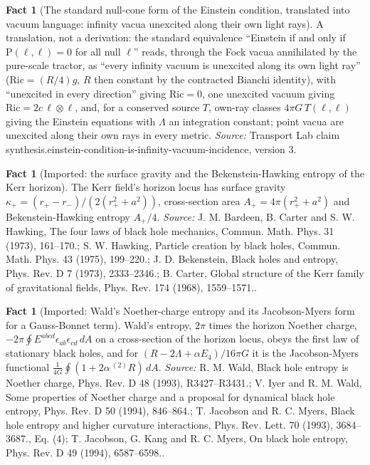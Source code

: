 \documentclass[11pt]{article}
\theoremstyle{definition}
\newtheorem{fact}[theorem]{Fact}
\theoremstyle{plain}
\providecommand{\Ric}{}\renewcommand{\Ric}{\mathrm{Ric}}
\providecommand{\Sch}{}\renewcommand{\Sch}{\mathrm{P}}
\begin{document}
\begin{fact}[The standard null-cone form of the Einstein condition, translated into vacuum language: infinity vacua unexcited along their own light rays]\label{c:synthesis.einstein-condition-is-infinity-vacuum-incidence}
A translation, not a derivation: the standard equivalence ``Einstein if and only if $\Sch(\ell,\ell) = 0$ for all null $\ell$'' reads, through the Fock vacua annihilated by the pure-scale tractor, as ``every infinity vacuum is unexcited along its own light ray'' ($\Ric = (R/4)g$, $R$ then constant by the contracted Bianchi identity), with ``unexcited in every direction'' giving $\Ric = 0$, one unexcited vacuum giving $\Ric = 2c\,\ell\otimes\ell$, and, for a conserved source $T$, own-ray classes $4\pi G\,T(\ell,\ell)$ giving the Einstein equations with $\Lambda$ an integration constant; point vacua are unexcited along their own rays in every metric.
\emph{Source:} Transport Lab claim synthesis.einstein-condition-is-infinity-vacuum-incidence, version 3.
\end{fact}

\begin{fact}[Imported: the surface gravity and the Bekenstein-Hawking entropy of the Kerr horizon]\label{c:synthesis.imported-kerr-surface-gravity-entropy}
The Kerr field's horizon locus has surface gravity $\kappa_{+} = (r_{+} - r_{-})/(2(r_{+}^{2} + a^{2}))$, cross-section area $A_{+} = 4\pi(r_{+}^{2} + a^{2})$ and Bekenstein-Hawking entropy $A_{+}/4$.
\emph{Source:} J. M. Bardeen, B. Carter and S. W. Hawking, The four laws of black hole mechanics, Commun. Math. Phys. 31 (1973), 161--170.; S. W. Hawking, Particle creation by black holes, Commun. Math. Phys. 43 (1975), 199--220.; J. D. Bekenstein, Black holes and entropy, Phys. Rev. D 7 (1973), 2333--2346.; B. Carter, Global structure of the Kerr family of gravitational fields, Phys. Rev. 174 (1968), 1559--1571..
\end{fact}

\begin{fact}[Imported: Wald's Noether-charge entropy and its Jacobson-Myers form for a Gauss-Bonnet term]\label{c:synthesis.imported-wald-noether-charge-entropy}
Wald's entropy, $2\pi$ times the horizon Noether charge, $-2\pi\oint E^{abcd}\epsilon_{ab}\epsilon_{cd}\,dA$ on a cross-section of the horizon locus, obeys the first law of stationary black holes, and for $(R - 2\Lambda + \alpha E_{4})/16\pi G$ it is the Jacobson-Myers functional $\frac{1}{4G}\oint(1 + 2\alpha\,{}^{(2)}\!R)\,dA$.
\emph{Source:} R. M. Wald, Black hole entropy is Noether charge, Phys. Rev. D 48 (1993), R3427--R3431.; V. Iyer and R. M. Wald, Some properties of Noether charge and a proposal for dynamical black hole entropy, Phys. Rev. D 50 (1994), 846--864.; T. Jacobson and R. C. Myers, Black hole entropy and higher curvature interactions, Phys. Rev. Lett. 70 (1993), 3684--3687., Eq. (4); T. Jacobson, G. Kang and R. C. Myers, On black hole entropy, Phys. Rev. D 49 (1994), 6587--6598..
\end{fact}
\end{document}

